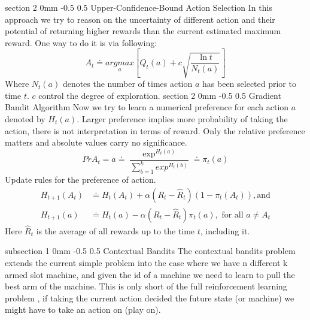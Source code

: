 \documentclass[twocolumn,11pt]{article}
\makeatletter
\renewcommand{\section}{\@startsection
{section}%
{2}%
{0mm}%
{-0.5\baselineskip}%
{0.5\baselineskip}%
{\bfseries\color{blue}}} %
\renewcommand{\subsection}{\@startsection
{subsection}%
{1}%
{0mm}%
{-0.5\baselineskip}%
{0.5\baselineskip}%
{\bfseries\color{blue}}} %
\makeatother
\begin{document}
\section{Upper-Confidence-Bound Action Selection }
In this approach we try to reason on the uncertainty of different action and their potential of returning higher rewards than the current estimated maximum reward. One way to do it is via following:\useshortskip
\begin{equation}
    A_t \doteq \underset{a}{argmax}[Q_t(a) + c\sqrt{\dfrac{\ln{t}}{N_t(a)}}]
\end{equation}
Where $N_t(a)$ denotes the number of times action $a$ has been selected prior to time $t$. $c $ control the degree of exploration.
\section{Gradient Bandit Algorithm}
Now we try to learn a numerical preference for each action $a$ denoted by $H_t(a)$. Larger preference implies more probability of taking the action, there is not interpretation in terms of reward. Only the relative preference matters and absolute values carry no significance. 
\begin{equation}
    Pr{A_t = a} \doteq \dfrac{\exp^{H_t(a)}}{\sum_{b=1 }^{k}exp^{H_t(b)}} \doteq \pi_t(a)
\end{equation}
Update rules for the preference of action.
\begin{equation}
    \begin{split}
        H_{t+1}(A_t) &\doteq H_t (A_t) + \alpha(R_t - \hat{R}_t)(1 - \pi_t(A_t)), \text{and}\\
        H_{t+1}(a) &\doteq H_t(a) - \alpha(R_t - \hat{R}_t)\pi_t(a), \text{ for all $a \neq A_t$}
    \end{split}
\end{equation}
Here $\hat{R}_t$ is the average of all rewards up to the time $t$, including it. 


\subsection{Contextual Bandits}
The contextual bandits problem extends the current simple problem into the case where we have n different k armed slot machine, and given the id of a machine we need to learn to pull the best arm of the machine. This is only short of the full reinforcement learning problem , if taking the current action decided the future state (or machine) we might have to take an action on (play on).




\end{document}
